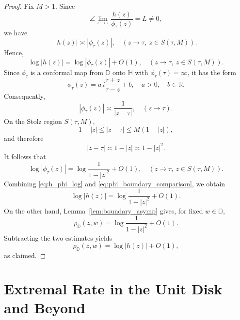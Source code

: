 \documentclass[10pt,a4paper]{amsart}
\numberwithin{equation}{section}
\begin{document}
\begin{proof}
Fix $M>1$. Since
\begin{equation*}
\angle\lim_{z\to\tau}\frac{h(z)}{\phi_\tau(z)}
=L\neq0,
\end{equation*}
we have
\begin{equation*}
|h(z)|\asymp |\phi_\tau(z)|,
\quad
(z\to\tau,\ z\in S(\tau,M)).
\end{equation*}
Hence,
\begin{equation}
\label{eq:h_phi_log}
\log|h(z)|
=
\log|\phi_\tau(z)|+O(1),
\quad
(z\to\tau,\ z\in S(\tau,M)).
\end{equation}
Since $\phi_\tau$ is a conformal map from $\mathbb{D}$ onto
$\mathbb{H}$ with $\phi_\tau(\tau)=\infty$, it has the form
\begin{equation*}
\phi_\tau(z)
=
a\,i\frac{\tau+z}{\tau-z}+b,
\quad a>0,\quad b\in\mathbb{R}.
\end{equation*}
Consequently,
\begin{equation*}
|\phi_\tau(z)|\asymp\frac{1}{|z-\tau|},
\quad (z\to\tau).
\end{equation*}
On the Stolz region $S(\tau,M)$,
\begin{equation*}
1-|z|
\le |z-\tau|
\le M(1-|z|),
\end{equation*}
and therefore
\begin{equation*}
|z-\tau|\asymp1-|z|\asymp1-|z|^2.
\end{equation*}
It follows that
\begin{equation}
\label{eq:phi_boundary_comparison}
\log|\phi_\tau(z)|
=
\log\frac{1}{1-|z|^2}+O(1),
\quad
(z\to\tau,\ z\in S(\tau,M)).
\end{equation}
Combining \eqref{eq:h_phi_log} and
\eqref{eq:phi_boundary_comparison}, we obtain
\begin{equation*}
\log|h(z)|
=
\log\frac{1}{1-|z|^2}+O(1).
\end{equation*}
On the other hand, Lemma~\ref{lem:boundary_asymp} gives, for fixed
$w\in\mathbb{D}$,
\begin{equation*}
\rho_{\mathbb{D}}(z,w)
=
\log\frac{1}{1-|z|^2}+O(1).
\end{equation*}
Subtracting the two estimates yields
\begin{equation*}
\rho_{\mathbb{D}}(z,w)
=
\log|h(z)|+O(1),
\end{equation*}
as claimed.
\end{proof}


\section{Extremal Rate in the Unit Disk and Beyond}
\label{sec:uds}
\end{document}
